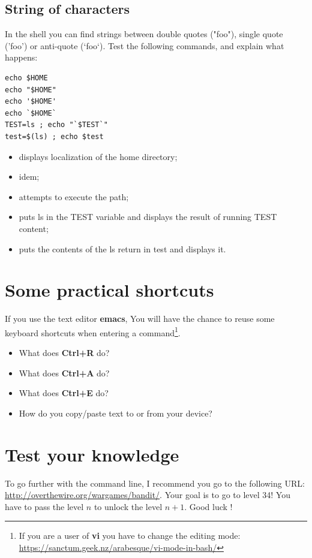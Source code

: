 \documentclass[11pt]{article}
\begin{document}
\subsection{String of characters}
In the shell you can find strings between double quotes ("foo"), single quote ('foo') or anti-quote (`foo`). Test the following commands, and explain what happens:

\begin{lstlisting}
echo $HOME
echo "$HOME"
echo '$HOME'
echo `$HOME`
TEST=ls ; echo "`$TEST`"
test=$(ls) ; echo $test
\end{lstlisting}

\begin{solution}
\begin{itemize}
 \item displays localization of the home directory;
 \item idem;
 \item attempts to execute the path;
 \item puts ls in the TEST variable and displays the result of running TEST content;
 \item puts the contents of the ls return in test and displays it.
\end{itemize}
\end{solution}


\section{Some practical shortcuts}

If you use the text editor \textbf{emacs}, You will have the chance to reuse some keyboard shortcuts when entering a command\footnote{If you are a user of \textbf{vi} you have to change the editing mode:
 \url{https://sanctum.geek.nz/arabesque/vi-mode-in-bash/}}.
\begin{itemize}
\item What does \textbf{Ctrl+R} do?
\item What does \textbf{Ctrl+A} do?
\item What does \textbf{Ctrl+E} do?
\item How do you copy/paste text to or from your device?
\end{itemize}


\section{Test your knowledge}

To go further with the command line, I recommend you go to the following URL: \url{http://overthewire.org/wargames/bandit/}. Your goal is to go to level 34! You have to pass the level \(n\) to unlock the level \(n + 1 \). Good luck !
\end{document}
